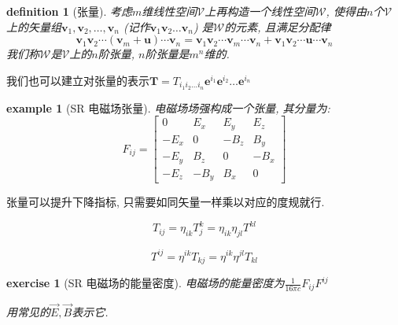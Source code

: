 \documentclass[12pt]{ctexbook}
\newtheorem{definition}{definition}
\numberwithin{definition}{section}
\numberwithin{theorem}{section}
\newtheorem{exercise}{exercise}
\numberwithin{exercise}{section}
\newtheorem{example}{example}
\numberwithin{example}{section}
\numberwithin{lemma}{section}
\begin{document}
    \begin{definition}
        [张量] 考虑\(m\)维线性空间\(\mathcal{V}\)上再构造一个线性空间\(\mathcal{W}\), 
        使得由\(n\)个\(\mathcal{V}\)上的矢量组\(\boldsymbol{v}_1, \boldsymbol{v}_2, \ldots, \boldsymbol{v}_n\)
        (记作\(\boldsymbol{v}_1 \boldsymbol{v}_2 \ldots \boldsymbol{v}_n\))
        是\(\mathcal{W}\)的元素, 且满足分配律
        \begin{equation}
            \boldsymbol{v}_1 \boldsymbol{v}_2 \cdots (\boldsymbol{v}_m + \boldsymbol{u}) \cdots \boldsymbol{v}_n = 
            \boldsymbol{v}_1 \boldsymbol{v}_2 \cdots \boldsymbol{v}_m \cdots \boldsymbol{v}_n + \boldsymbol{v}_1 \boldsymbol{v}_2 \cdots \boldsymbol{u} \cdots \boldsymbol{v}_n
        \end{equation}
        我们称\(\mathcal{W}\)是\(\mathcal{V}\)上的\(n\)阶张量, \(n\)阶张量是\(m^n\)维的.
    \end{definition}

    我们也可以建立对张量的表示\(\boldsymbol{T} = T_{i_1 i_2 \ldots i_n} \boldsymbol{e}^{i_1}\boldsymbol{e}^{i_2}\ldots\boldsymbol{e}^{i_n}\)

    \begin{example}
        [SR 电磁场张量] 电磁场场强构成一个张量, 其分量为:
        \begin{equation}
            F_{ij} = \begin{bmatrix}
                0 & E_x & E_y & E_z \\
                -E_x & 0 & -B_z & B_y \\
                -E_y & B_z & 0 & -B_x \\
                -E_z & -B_y & B_x & 0
            \end{bmatrix}
        \end{equation}
    \end{example}

    张量可以提升下降指标, 只需要如同矢量一样乘以对应的度规就行.

    \begin{equation}
        T_{ij} = \eta_{ik} T^k_j = \eta_{ik} \eta_{jl} T^{kl}
    \end{equation}

    \begin{equation}
        T^{ij} = \eta^{ik} T_{kj} = \eta^{ik} \eta^{jl} T_{kl}
    \end{equation}

    \begin{exercise}
        [SR 电磁场的能量密度] 电磁场的能量密度为\(\frac{1}{16\pi c}F_{ij}F^{ij}\)

        用常见的\(\vec{E},\vec{B}\)表示它.\footnotemark{}
    \end{exercise}
\end{document}
